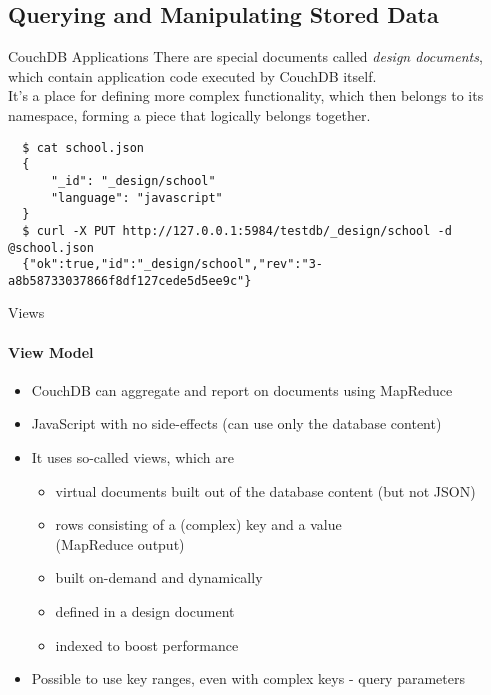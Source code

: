 \documentclass{beamer}
\begin{document}
\subsection{Querying and Manipulating Stored Data}
\begin{frame}[fragile]{CouchDB Applications}
  There are special documents called \textit{design documents},\\which contain
  application code executed by CouchDB itself.\\It's a place for defining
  more complex functionality, which then belongs to its namespace, forming
  a piece that logically belongs together.
  \fontsize{6}{8}\selectfont
  \begin{verbatim}
  $ cat school.json 
  {
      "_id": "_design/school"
      "language": "javascript"
  }
  $ curl -X PUT http://127.0.0.1:5984/testdb/_design/school -d @school.json
  {"ok":true,"id":"_design/school","rev":"3-a8b58733037866f8df127cede5d5ee9c"}
  \end{verbatim}
\end{frame}

\begin{frame}{Views}
  \framesubtitle{View Model}
  \begin{itemize}
    \item CouchDB can aggregate and report on documents using MapReduce
    \item JavaScript with no side-effects (can use only the database content)
    \item It uses so-called views, which are 
    \begin{itemize}
      \item virtual documents built out of the database content (but not JSON)
      \item rows consisting of a (complex) key and a value\\(MapReduce output)
      \item built on-demand and dynamically
      \item defined in a design document
      \item indexed to boost performance
    \end{itemize}
    \item Possible to use key ranges, even with complex keys - query parameters
  \end{itemize}
\end{frame}
\end{document}
